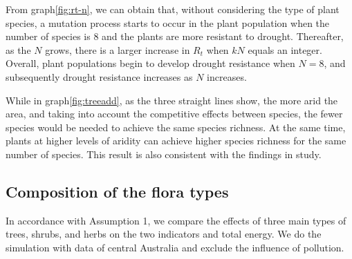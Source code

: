 \documentclass[12pt]{article}  %
\begin{document}
\vspace{-0.5cm}
From graph\eqref{fig:rt-n}, we can obtain that, without considering the type of plant species, a mutation process starts to occur in the plant population when the number of species is 8 and the plants are more resistant to drought. Thereafter, as the $N$ grows, there is a larger increase in $R_t$ when $kN$ equals an integer. Overall, plant populations begin to develop drought resistance when $N=8$, and subsequently drought resistance increases as $N$ increases.

While in graph\eqref{fig:treeadd}, as the three straight lines show, the more arid the area, and taking into account the competitive effects between species, the fewer species would be needed to achieve the same species richness. At the same time, plants at higher levels of aridity can achieve higher species richness for the same number of species. This result is also consistent with the findings in study{\cite{12}}.

\subsection{Composition of the flora types}

In accordance with Assumption 1, we compare the effects of three main types of trees, shrubs, and herbs on the two indicators and total energy. We do the simulation with data of central Australia and exclude the influence of pollution. 
\end{document}
